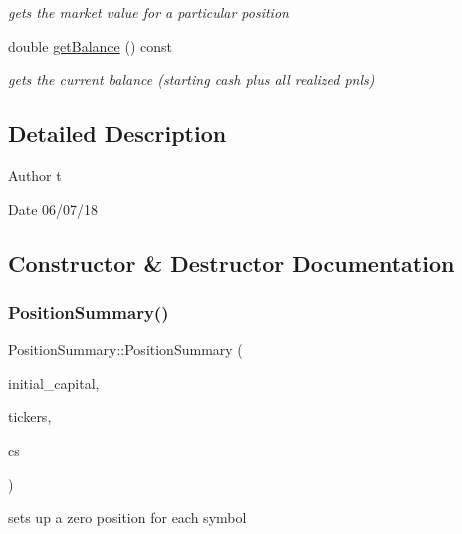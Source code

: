 \begin{DoxyCompactItemize}
\begin{DoxyCompactList}\small\item\em gets the market value for a particular position \end{DoxyCompactList}\item 
double \hyperlink{classPositionSummary_a1c8772fe401f8d00de795ff09b856d44}{get\+Balance} () const
\begin{DoxyCompactList}\small\item\em gets the current balance (starting cash plus all realized pnls) \end{DoxyCompactList}\end{DoxyCompactItemize}


\subsection{Detailed Description}
\begin{DoxyAuthor}{Author}
t 
\end{DoxyAuthor}
\begin{DoxyDate}{Date}
06/07/18 
\end{DoxyDate}


\subsection{Constructor \& Destructor Documentation}
\mbox{\label{classPositionSummary_a466b4163900712b20ef0c24661d6fc2f}} 
\subsubsection{\texorpdfstring{Position\+Summary()}{PositionSummary()}}
{\footnotesize\ttfamily Position\+Summary\+::\+Position\+Summary (\begin{DoxyParamCaption}\item[{double}]{initial\+\_\+capital,  }\item[{const std\+::vector$<$ std\+::string $>$ \&}]{tickers,  }\item[{\hyperlink{pnl__calculator_8h_ad733a3c57302a7ac3408d55dc65f2681}{Commission\+Style}}]{cs }\end{DoxyParamCaption})}



sets up a zero position for each symbol 


